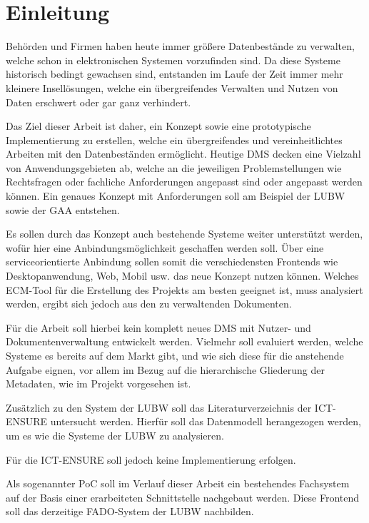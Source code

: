 \section{Einleitung} \label{Einfuehrung}
Beh\"orden und Firmen haben heute immer gr\"o\ss{}ere Datenbest\"ande zu verwalten, welche schon in elektronischen Systemen vorzufinden sind. Da diese Systeme historisch bedingt gewachsen sind, entstanden im Laufe der Zeit immer mehr kleinere Insell\"osungen, welche ein \"ubergreifendes Verwalten und Nutzen von Daten erschwert oder gar ganz verhindert.

Das Ziel dieser Arbeit ist daher, ein Konzept sowie eine prototypische Implementierung zu erstellen, welche ein \"ubergreifendes und vereinheitlichtes Arbeiten mit den Datenbest\"anden erm\"oglicht. Heutige \ac{DMS} decken eine Vielzahl von Anwendungsgebieten ab, welche an die jeweiligen Problemstellungen wie Rechtsfragen oder fachliche Anforderungen angepasst sind oder angepasst werden k\"onnen.
Ein genaues Konzept mit Anforderungen soll am Beispiel der \ac{LUBW} sowie der \ac{GAA} entstehen.
\cite{Dokumenten-Management}

Es sollen durch das Konzept auch bestehende Systeme weiter unterst\"utzt werden, wof\"ur hier eine Anbindungsm\"oglichkeit geschaffen werden soll. \"Uber eine serviceorientierte Anbindung sollen somit die verschiedensten Frontends wie Desktopanwendung, Web, Mobil usw. das neue Konzept nutzen k\"onnen. Welches \ac{ECM}-Tool f\"ur die Erstellung des Projekts am besten geeignet ist, muss analysiert werden, ergibt sich jedoch aus den zu verwaltenden Dokumenten.

F\"ur die Arbeit soll hierbei kein komplett neues \ac{DMS} mit Nutzer- und Dokumentenverwaltung entwickelt werden. Vielmehr soll evaluiert werden, welche Systeme es bereits auf dem Markt gibt, und wie sich diese f\"ur die anstehende Aufgabe eignen, vor allem im Bezug auf die hierarchische Gliederung der Metadaten, wie im Projekt vorgesehen ist. 

Zus\"atzlich zu den System der \ac{LUBW} soll das Literaturverzeichnis der \ac{ICT-ENSURE} untersucht werden. Hierf\"ur soll das Datenmodell herangezogen werden, um es wie die Systeme der \ac{LUBW} zu analysieren. 

F\"ur die \ac{ICT-ENSURE} soll jedoch keine Implementierung erfolgen.

Als sogenannter \ac{PoC} soll im Verlauf dieser Arbeit ein bestehendes Fachsystem auf der Basis einer erarbeiteten Schnittstelle nachgebaut werden. Diese Frontend soll das derzeitige \ac{FADO}-System der \ac{LUBW} nachbilden.